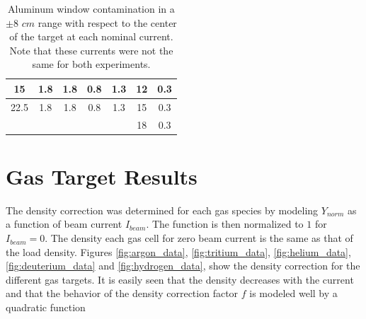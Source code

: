 \documentclass[final,5p,times,twocolumn]{elsarticle}
\begin{document}
\begin{table}[h!]
\begin{tabular}{|c|c|c|c|c|c|c|}
15                                                               & 1.8                                                             & 1.8                                                              & 0.8                                                             & 1.3                                                             & 12                                                              & 0.3                                                                                \\ \hline
22.5                                                             & 1.8                                                             & 1.8                                                              & 0.8                                                             & 1.3                                                             & 15                                                              & 0.3                                                                                \\ \hline
\multicolumn{5}{|l|}{}                                                                                                                                                                                                                                                                                                                    & 18                                                              & 0.3                                                                                \\ \hline
\end{tabular}
\caption{Aluminum window contamination in a $\pm 8$ $cm$ range with respect to the center of the target at each nominal current. Note that these currents were not the same for both experiments.}
\label{tab:contamination_al}
\end{table}

\section{Gas Target Results}

The density correction was determined for each gas species by modeling $Y_{norm}$ as a function of beam current $I_{beam}$. The function is then normalized to $1$ for $I_{beam}=0$. The density each gas cell for zero beam current is the same as that of the load density. Figures  \ref{fig:argon_data}, \ref{fig:tritium_data}, \ref{fig:helium_data}, \ref{fig:deuterium_data} and \ref{fig:hydrogen_data}, show the density correction for the different gas targets. It is easily seen that the density decreases with the current and that the behavior of the density correction factor $f$ is modeled well by a quadratic function
\end{document}
